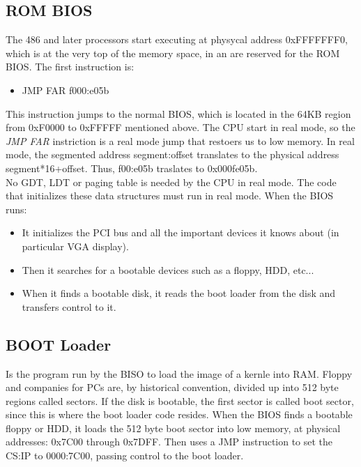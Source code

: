 \documentclass[12pt]{article}
\begin{document}
\subsection{ROM BIOS}
The 486 and later processors start executing at physycal address 0xFFFFFFF0, which is at the very top of the memory space, in an are reserved for the ROM BIOS. The first instruction is:
\begin{itemize}
  \item [] JMP FAR f000:e05b
\end{itemize}
This instruction jumps to the normal BIOS, which is located in the 64KB region from 0xF0000 to 0xFFFFF mentioned above.
The CPU start in real mode, so the \textit{JMP FAR} instriction is a real mode jump that restoers us to low memory. In real mode, the segmented address segment:offset translates to the physical address segment*16+offset. Thus, f00:e05b traslates to 0x000fe05b.\\
No GDT, LDT or paging table is needed by the CPU in real mode. The code that initializes these data structures must run in real mode. When the BIOS runs:
\begin{itemize}
  \item It initializes the PCI bus and all the important devices it knows about (in particular VGA display).
  \item Then it searches for a bootable devices such as a floppy, HDD, etc...
  \item When it finds a bootable disk, it reads the boot loader from the disk and transfers control to it.
\end{itemize}

\subsection{BOOT Loader}
Is the program run by the BISO to load the image of a kernle into RAM. Floppy and companies for PCs are, by historical convention, divided up into 512 byte regions called sectors. If the disk is bootable, the first sector is called boot sector, since this is where the boot loader code resides. When the BIOS finds a bootable floppy or HDD, it loads the 512 byte boot sector into low memory, at physical addresses: 0x7C00 through 0x7DFF. Then uses a JMP instruction to set the CS:IP to 0000:7C00, passing control to the boot loader.
\end{document}
